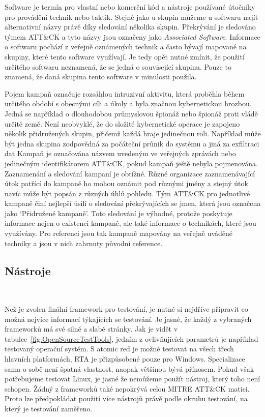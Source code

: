 Software je termín pro vlastní nebo komerční kód a nástroje používané útočníky pro provádění technik nebo taktik.
Stejně jako u skupin můžeme u softwaru najít alternativní názvy právě díky sledování několika skupin.
Překrývání je sledováno týmem ATT\&CK a tyto názvy jsou označeny jako \textit{Associated Software}.
Informace o softwaru pochází z veřejně oznámených technik a často bývají mapované na skupiny, které tento software využívají.
Je tedy opět nutné zmínit, že použití určitého softwaru neznamená, že se jedná o související skupinu.
Pouze to znamená, že daná skupina tento software v minulosti použila.\cite{Mitre_software}


Pojem kampaň označuje rozsáhlou intruzivní aktivitu, která proběhla během určitého období s obecnými cíli a úkoly a byla značnou kybernetickou hrozbou.
Jedná se například o dlouhodobou průmyslovou špionáž nebo špionáž proti vládě určité země.
Není neobvyklé, že do složité kybernetické operace je zapojeno několik přidružených skupin, přičemž každá hraje jedinečnou roli.
Například může být jedna skupina zodpovědná za počáteční průnik do systému a jiná za exfiltraci dat
Kampaň je označována názvem uvedeným ve veřejných zprávách nebo jedinečným identifikátorem ATT\&CK, pokud kampaň ještě nebyla pojmenována.
Zaznamenání a sledování kampaní je obtížné.
Různé organizace zaznamenávající útok patřící do kampaně ho mohou oznámit pod různými jmény a stejný útok navíc může být popsán z různých úhlů pohledu.
Tým ATT\&CK pro jednotlivé kampaně činí nejlepší úsilí o sledování překrývajících se jmen, která jsou označena jako `Přidružené kampaně'.
Toto sledování je výhodné, protože poskytuje informace nejen o existenci kampaně, ale také informace o technikách, které jsou využívány.
Pro referenci jsou tak kampaně mapovány na veřejně uváděné techniky a jsou v nich zahrnuty původní reference.\cite{Mitre_campaigns}

\subsection{Nástroje}\label{subsec:nastroje}
~

Než je zvolen finální framework pro testování, je nutné si nejdříve připravit co možná nejvíce informací týkajících se testování.
Je jasné, že každý z vybraných frameworků má své silné a slabé stránky.
Jak je vidět v tabulce~\ref{fig:OpenSourceTestTools}, jedním z ovlivňujících parametrů je například testovaný operační systém.
S atomic red je možné testovat na všech třech hlavních platformách, \ac{RTA} je přizpůsobené pouze pro Windows.
Specializace sama o sobě není špatná vlastnost, naopak většinou bývá přínosem.
Pokud však potřebujeme testovat Linux, je jasné že nemůžeme použít nástroj, který toho není schopen.
Žádný z frameworků také nepokrývá celou MITRE ATT\&CK matici.
Proto lze předpokládat použití více nástrojů právě podle okruhu testování, na který je testování zaměřeno.

